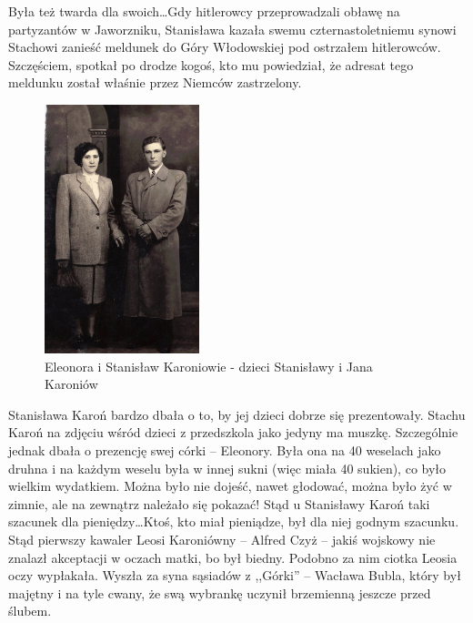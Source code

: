 Była też twarda dla swoich\ldots Gdy hitlerowcy przeprowadzali obławę na partyzantów w Jaworzniku, Stanisława kazała swemu czternastoletniemu synowi Stachowi zanieść meldunek do Góry Włodowskiej pod ostrzałem hitlerowców. Szczęściem, spotkał po drodze kogoś, kto mu powiedział, że adresat tego meldunku został właśnie przez Niemców zastrzelony.


\begin{figure}
\begin{center}
\includegraphics[width=0.4\textwidth]{zdjecia/eleonora_i_stanislaw_karoniowie.jpg}
\caption[Eleonora i Stanisław Karoniowie]{Eleonora i Stanisław Karoniowie - dzieci Stanisławy i Jana Karoniów}
\label{rys:eleonora_i_stanislaw_karoniowie}
\end{center}
\end{figure}

Stanisława Karoń bardzo dbała o to, by jej dzieci dobrze się prezentowały. Stachu Karoń na zdjęciu wśród 
dzieci z przedszkola jako jedyny ma muszkę. Szczególnie jednak dbała o prezencję swej córki -- Eleonory. Była ona na 40 weselach jako druhna i na każdym weselu była w innej sukni (więc miała 40 sukien), co było wielkim wydatkiem. Można było nie dojeść, nawet głodować, można było żyć w zimnie, ale na zewnątrz należało się pokazać! Stąd u Stanisławy Karoń taki szacunek dla pieniędzy\ldots Ktoś, kto miał pieniądze, był dla niej godnym szacunku. Stąd pierwszy kawaler Leosi Karoniówny -- Alfred Czyż -- jakiś wojskowy nie znalazł akceptacji w oczach matki, bo był biedny. Podobno za nim ciotka Leosia oczy wypłakała. Wyszła za syna sąsiadów z ,,Górki'' -- Wacława Bubla, który był majętny i na tyle cwany, że swą wybrankę uczynił brzemienną jeszcze przed ślubem.

